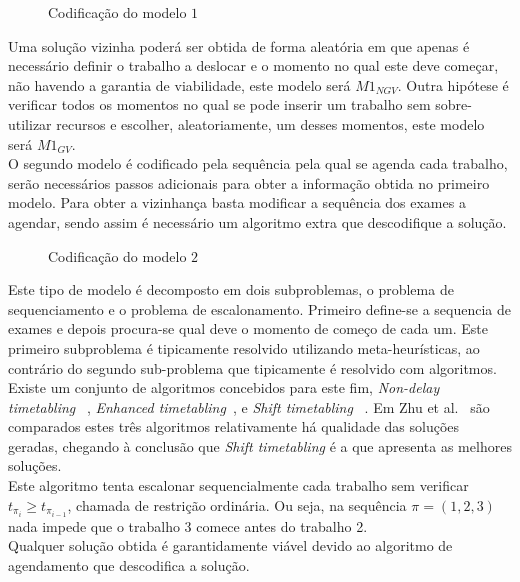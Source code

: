 \begin{figure}[h]
	\centering
	\makebox[\textwidth][c]{%
		\texttt{[image: P1M1]}
	}
	\caption{Codificação do modelo $1$}
	\label{fig:cod_prob1_mod1}
\end{figure}

Uma solução vizinha poderá ser obtida de forma aleatória em que apenas é necessário definir o trabalho a deslocar e o momento no qual este deve começar, não havendo a garantia de viabilidade, este modelo será $M1_{NGV}$. Outra hipótese é verificar todos os momentos no qual se pode inserir um trabalho sem sobre-utilizar recursos e escolher, aleatoriamente, um desses momentos, este modelo será $M1_{GV}$.\\

O segundo modelo é codificado pela sequência pela qual se agenda cada trabalho, serão necessários passos adicionais para obter a informação obtida no primeiro modelo. Para obter a vizinhança basta modificar a sequência dos exames a agendar, sendo assim é necessário um algoritmo extra que descodifique a solução.\\

\begin{figure}[h]
	\centering
	\makebox[\textwidth][c]{%
		\texttt{[image: P1M2]}
	}
	\caption{Codificação do modelo $2$}
	\label{fig:cod_prob1_mod2}
\end{figure}

Este tipo de modelo é decomposto em dois subproblemas, o problema de sequenciamento e o problema de escalonamento. Primeiro define-se a sequencia de exames e depois procura-se qual deve o momento de começo de cada um. Este primeiro subproblema é tipicamente resolvido utilizando meta-heurísticas, ao contrário do segundo sub-problema que tipicamente é resolvido com algoritmos.\\
Existe um conjunto de algoritmos concebidos para este fim, \textit{Non-delay timetabling}~\cite{schusterNowaitJobShop2006} , \textit{Enhanced timetabling}~\cite{framinanEnhancedTimetablingProcedure2006}, e \textit{Shift timetabling}~\cite{zhuCompleteLocalSearch2009} . Em Zhu et al.~\cite{zhuCompleteLocalSearch2009} são comparados estes três algoritmos relativamente há qualidade das soluções geradas, chegando à conclusão que \textit{Shift timetabling} é a que apresenta as melhores soluções.\\
Este algoritmo tenta escalonar sequencialmente cada trabalho sem verificar $t_{\pi_{i}} \geq t_{\pi_{i-1}}$, chamada de restrição ordinária. Ou seja, na sequência $\pi=(1,2,3)$ nada impede que o trabalho 3 comece antes do trabalho 2.\\
Qualquer solução obtida é garantidamente viável devido ao algoritmo de agendamento que descodifica a solução.\\

